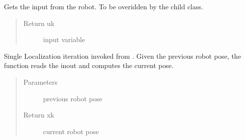 \documentclass[letterpaper,10pt,english]{sphinxmanual}
\begin{document}
\begin{fulllineitems}
\begin{fulllineitems}
\begin{quote}
\begin{description}
\end{description}\end{quote}

\end{fulllineitems}


\begin{fulllineitems}
\label{\detokenize{Localization:Localization.Localization.GetInput}}
\sphinxAtStartPar
Gets the input from the robot. To be overidden by the child class.
\begin{quote}\begin{description}
\item[{Return uk}] \leavevmode
\sphinxAtStartPar
input variable

\end{description}\end{quote}

\end{fulllineitems}


\begin{fulllineitems}
\label{\detokenize{Localization:Localization.Localization.Localize}}
\sphinxAtStartPar
Single Localization iteration invoked from . Given the previous robot pose, the function reads the inout and computes the current pose.
\begin{quote}\begin{description}
\item[{Parameters}] \leavevmode
\sphinxAtStartPar
{} \textendash{} previous robot pose

\item[{Return xk}] \leavevmode
\sphinxAtStartPar
current robot pose

\end{description}\end{quote}

\end{fulllineitems}



\end{fulllineitems}
\end{document}
